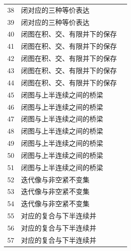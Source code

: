 \begin{longtable}{r p{.66\linewidth} r}
38 & 闭对应的三种等价表达 & \pageref{g:108:35}\\

39 & 闭对应的三种等价表达 & \pageref{g:108:35}\\

40 & 闭图在积、交、有限并下的保存 & \pageref{g:108:40}\\

41 & 闭图在积、交、有限并下的保存 & \pageref{g:108:40}\\

42 & 闭图在积、交、有限并下的保存 & \pageref{g:108:40}\\

43 & 闭图在积、交、有限并下的保存 & \pageref{g:108:40}\\

44 & 闭图在积、交、有限并下的保存 & \pageref{g:108:40}\\

45 & 闭图与上半连续之间的桥梁 & \pageref{g:108:45}\\

46 & 闭图与上半连续之间的桥梁 & \pageref{g:108:45}\\

47 & 闭图与上半连续之间的桥梁 & \pageref{g:108:45}\\

48 & 闭图与上半连续之间的桥梁 & \pageref{g:108:45}\\

49 & 闭图与上半连续之间的桥梁 & \pageref{g:108:45}\\

50 & 闭图与上半连续之间的桥梁 & \pageref{g:108:45}\\

51 & 闭图与上半连续之间的桥梁 & \pageref{g:108:45}\\

52 & 迭代像与非空紧不变集 & \pageref{g:108:52}\\

53 & 迭代像与非空紧不变集 & \pageref{g:108:52}\\

54 & 迭代像与非空紧不变集 & \pageref{g:108:52}\\

55 & 对应的复合与下半连续并 & \pageref{g:108:55}\\

56 & 对应的复合与下半连续并 & \pageref{g:108:55}\\

57 & 对应的复合与下半连续并 & \pageref{g:108:55}\\


\end{longtable}
